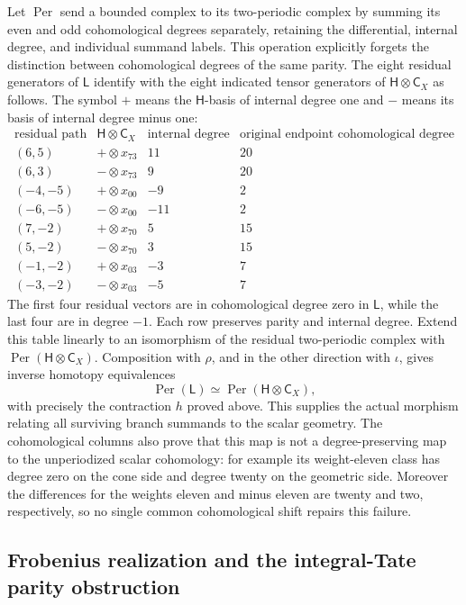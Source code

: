 Let \(\operatorname{Per}\) send a bounded complex to its two-periodic
complex by summing its even and odd cohomological degrees separately,
retaining the differential, internal degree, and individual summand
labels. This operation explicitly forgets the distinction between
cohomological degrees of the same parity. The eight residual
generators of \(\mathsf L\) identify with the eight indicated tensor
generators of \(\mathsf H\otimes\mathsf C_X\) as follows. The symbol
\(+\) means the \(\mathsf H\)-basis of internal degree one and
\(-\) means its basis of internal degree minus one:
\[
\begin{array}{c|c|r|r}
\text{residual path}&\mathsf H\otimes\mathsf C_X
 &\text{internal degree}&\text{original endpoint cohomological degree}\\\hline
(6,5)&+\otimes x_{73}&11&20\\
(6,3)&-\otimes x_{73}&9&20\\
(-4,-5)&+\otimes x_{00}&-9&2\\
(-6,-5)&-\otimes x_{00}&-11&2\\
(7,-2)&+\otimes x_{70}&5&15\\
(5,-2)&-\otimes x_{70}&3&15\\
(-1,-2)&+\otimes x_{03}&-3&7\\
(-3,-2)&-\otimes x_{03}&-5&7
\end{array}
\]
The first four residual vectors are in cohomological degree zero
in \(\mathsf L\), while the last four are in degree \(-1\).
Each row preserves parity and internal degree. Extend this table
linearly to an isomorphism of the residual two-periodic complex
with \(\operatorname{Per}(\mathsf H\otimes\mathsf C_X)\).
Composition with \(\rho\), and in the other direction with
\(\iota\), gives inverse homotopy equivalences
\[
 \operatorname{Per}(\mathsf L)
       \simeq\operatorname{Per}(\mathsf H\otimes\mathsf C_X),
\]
with precisely the contraction \(h\) proved above. This supplies
the actual morphism relating all surviving branch summands to the
scalar geometry. The cohomological columns also prove that this
map is not a degree-preserving map to the unperiodized scalar
cohomology: for example its weight-eleven class has degree zero
on the cone side and degree twenty on the geometric side.
Moreover the differences for the weights eleven and minus eleven
are twenty and two, respectively, so no single common cohomological
shift repairs this failure.

\subsection{Frobenius realization and the integral-Tate parity obstruction}

